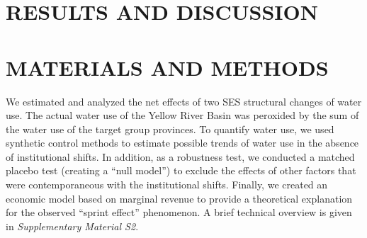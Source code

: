 \documentclass{../nsr}
\begin{document}
\section{RESULTS AND DISCUSSION}\label{results}



%
%

%


\section{MATERIALS AND METHODS}

We estimated and analyzed the net effects of two SES structural changes of water use. The actual water use of the Yellow River Basin was peroxided by the sum of the water use of the target group provinces. To quantify water use, we used synthetic control methods to estimate possible trends of water use in the absence of institutional shifts. In addition, as a robustness test, we conducted a matched placebo test (creating a “null model”) to exclude the effects of other factors that were contemporaneous with the institutional shifts. Finally, we created an economic model based on marginal revenue to provide a theoretical explanation for the observed “sprint effect” phenomenon. A brief technical overview is given in \textit{Supplementary Material S2}.
\end{document}
